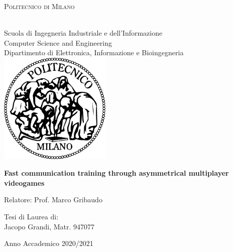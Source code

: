 \documentclass[12pt]{article}
\newcommand\blankpage{%
    \null
    \thispagestyle{empty}%
    \addtocounter{page}{-1}%
    \newpage}
\begin{document}
\setlength{\parindent}{0in}

\begin{titlepage}
\begin{center}

\begin{large} 
\textsc{Politecnico di Milano}
\end{large}
\\
Scuola di Ingegneria Industriale e dell’Informazione \\
Computer Science and Engineering \\
Dipartimento di Elettronica, Informazione e Bioingegneria \\

\vspace{0.8cm}
\includegraphics[width=0.4\textwidth]{poli}

\vspace{2cm}

\begin{Large}
\textbf{Fast communication training through asymmetrical multiplayer videogames}
\end{Large}

\vspace{2cm}

\begin{flushleft}
Relatore:
Prof. Marco Gribaudo
\end{flushleft}

\vspace{1cm}

\begin{flushright}
Tesi di Laurea di: \\
Jacopo Grandi, Matr. 947077
\end{flushright}

\vfill
Anno Accademico 2020/2021
\end{center}
\end{titlepage}

\clearpage

\afterpage{\blankpage}
\end{document}
